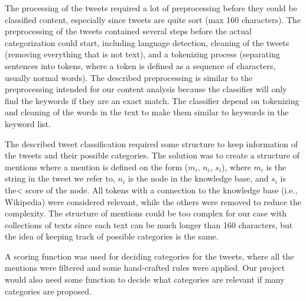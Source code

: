 
The processing of the tweets required a lot of preprocessing before they could be classified content, especially since tweets are quite sort (max 160 characters).  The preprocessing of the tweets contained several steps before the actual categorization could start, including language detection, cleaning of the tweets (removing everything that is not text), and a tokenizing process (separating sentences into tokens, where a token is defined as a sequence of characters, usually normal words). The described preprocessing is similar to the preprocessing intended for our content analysis because the classifier will only find the keywords if they are an exact match. The classifier depend on tokenizing and cleaning of the words in the text to make them similar to keywords in the keyword list.  

The described tweet classification required some structure to keep information of the tweets and their possible categories. The solution was to create a structure of mentions where a mention is defined on the form ($m_{i}$, $n_{i}$, $s_{i}$), where $m_{i}$ is the string in the tweet we refer to, $n_{i}$ is the node in the knowledge base, and  $s_{i}$ is the< score of the node. All tokens with a connection to the knowledge base (i.e., Wikipedia) were considered relevant, while the others were removed to reduce the complexity. The structure of mentions could be too complex for our case with collections of texts since each text can be much longer than 160 characters, but the idea of keeping track of possible categories is the same. 

A scoring function was used for deciding categories for the tweets, where all the mentions were filtered and some hand-crafted rules were applied. Our project would also need some function to decide what categories are relevant if many categories are proposed. 
